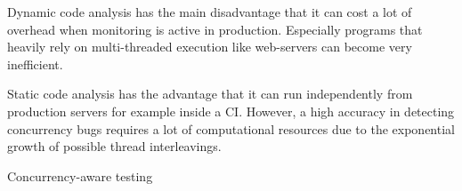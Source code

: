\documentclass[conference]{IEEEtran}
\begin{document}
Dynamic code analysis has the main disadvantage that it can cost a lot of overhead when monitoring is active in production.
Especially programs that heavily rely on multi-threaded execution like web-servers  can become very inefficient.

Static code analysis has the advantage that it can run independently from production servers for example inside a CI.
However, a high accuracy in detecting concurrency bugs requires a lot of computational resources due to the exponential growth of possible thread interleavings.

Concurrency-aware testing



\end{document}
